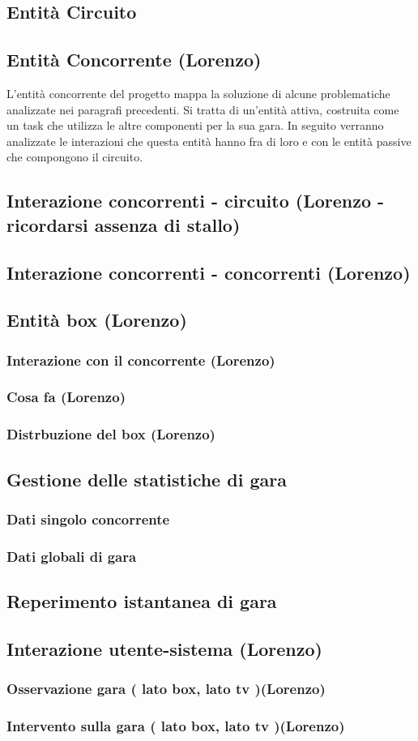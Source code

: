 \label{soluzione_problematiche}
\subsection{Entit\`{a} Circuito}
\subsection{Entit\`{a} Concorrente (Lorenzo)}
L'entità concorrente del progetto mappa la soluzione di alcune problematiche analizzate nei paragrafi precedenti. Si tratta di un'entità attiva, costruita come un task che utilizza le altre componenti per la sua gara. In seguito verranno analizzate le interazioni che questa entità hanno fra di loro e con le entità passive che compongono il circuito.
\subsection{Interazione concorrenti - circuito (Lorenzo - ricordarsi assenza di stallo)}
\subsection{Interazione concorrenti - concorrenti (Lorenzo)}
\subsection{Entità box (Lorenzo)}
     \subsubsection{Interazione con il concorrente (Lorenzo)}
     \subsubsection{Cosa fa (Lorenzo)}
     \subsubsection{Distrbuzione del box (Lorenzo)}
\subsection{Gestione delle statistiche di gara}
     \subsubsection{Dati singolo concorrente}
     \subsubsection{Dati globali di gara}
\subsection{Reperimento istantanea di gara}
\subsection{Interazione utente-sistema (Lorenzo)}
     \subsubsection{Osservazione gara ( lato box, lato tv )(Lorenzo)}
     \subsubsection{Intervento sulla gara ( lato box, lato tv )(Lorenzo)}